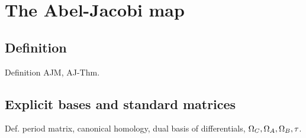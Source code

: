 \documentclass[main.tex]{subfiles}
\begin{document}
  \section{The Abel-Jacobi map}

  \subsection{Definition}
  
    Definition AJM, AJ-Thm.
    
  \subsection{Explicit bases and standard matrices}\label{subsec:bases_matrices}
  
    Def. period matrix, canonical homology, dual basis of differentials, $\Omega_C,\Omega_A,\Omega_B,\tau$.
  
\end{document}

